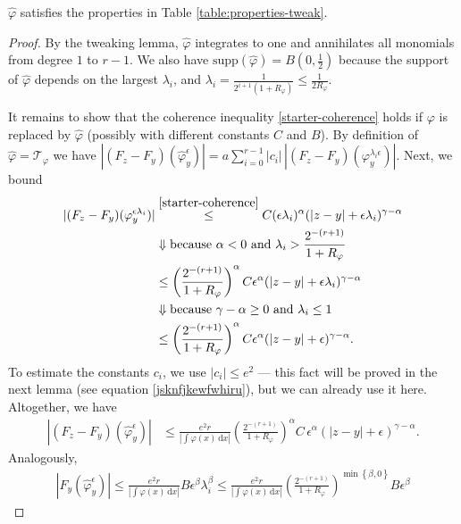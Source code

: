 \begin{lemma}\label{lemma:hat-phi-satisfies-table}
    $\hat \varphi$ satisfies the properties in Table \ref{table:properties-tweak}.
\end{lemma}
\begin{proof}
    By the tweaking lemma, $\hat \varphi$ integrates to one and annihilates all monomials from degree $1$ to $r-1$. 
    We also have $\mathrm{supp}(\hat \varphi) = B(0,\frac{1}{2})$ because the support of $\hat \varphi$ depends on the largest $\lambda_i$, and $\lambda_i = \frac{1}{2^{i+1}(1+R_\varphi)} \leq \frac{1}{2R_\varphi}$. 
    
    It remains to show that the coherence inequality 
    \eqref{starter-coherence} holds if $\varphi$ is replaced by $\hat \varphi$ (possibly with different constants $C$ and $B$). By definition of $\hat \varphi = \mathcal{T}_\varphi$ we have $|(F_z - F_y)(\hat \varphi^\epsilon_y)| = a\sum^{r-1}_{i=0} |c_i| \, |(F_z - F_y)(\varphi_y^{\lambda_i \epsilon})|$. Next, we bound
    \begin{align*}
        |(F_z - F_y)(\varphi_y^{ \epsilon \lambda_i})| &\overset{\eqref{starter-coherence}}{\leq}  C(\epsilon\lambda_i)^\alpha(|z-y| + \epsilon\lambda_i)^{\gamma-\alpha} \\
        &\Downarrow \text{because $\alpha < 0$ and $\lambda_i > \frac{2^{-(r+1)}}{1+R_\varphi}$}\\
        &\leq  \left(\frac{2^{-(r+1)}}{1+R_\varphi}\right)^\alpha C\epsilon^\alpha(|z-y| + \epsilon\lambda_i)^{\gamma - \alpha} \\
        &\Downarrow \text{because $\gamma - \alpha \geq 0$ and $\lambda_i \leq 1$}\\
        &\leq   \left(\frac{2^{-(r+1)}}{1+R_\varphi}\right)^\alpha C \epsilon^\alpha(|z-y| + \epsilon)^{\gamma - \alpha}.
    \end{align*}
    To estimate the constants $c_i$, we use $|c_i| \leq e^2$ --- this fact will be proved in the next lemma (see equation \eqref{jsknfjkewfwhiru}), but we can already use it here. Altogether, we have  
    \begin{align*}
        |(F_z - F_y)(\hat \varphi^\epsilon_y)| &\leq \frac{e^2 r}{|\int \varphi(x)\, \mathrm{d}x|} \left(\frac{2^{-(r+1)}}{1+R_\varphi}\right)^\alpha C \, \epsilon^\alpha(|z-y| + \epsilon)^{\gamma - \alpha}.
    \end{align*}
    Analogously, 
    \begin{align*}
        |F_y(\hat \varphi^\epsilon_y)| \leq \frac{e^2 r}{|\int \varphi(x)\, \mathrm{d}x|} B \epsilon^\beta\lambda_i^\beta \leq  \frac{e^2 r}{|\int \varphi(x)\, \mathrm{d}x|}  \left(\frac{2^{-(r+1)}}{1+R_\varphi}\right)^{\min\left\{ \beta, 0 \right\} }B\epsilon^\beta

\end{align*}
\end{proof}

